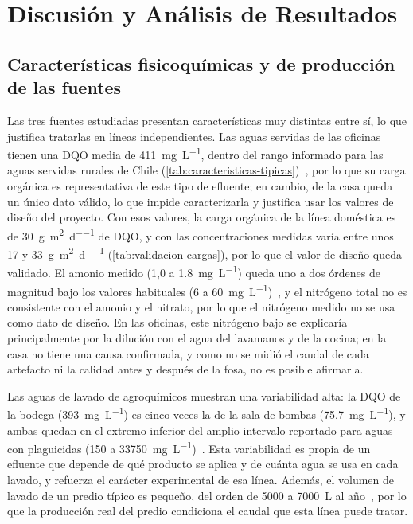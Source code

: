\chapter{Discusión y Análisis de Resultados}
\label{cap:discusion}

\section{Características fisicoquímicas y de producción de las fuentes}
\label{sec:dis-caracterizacion}

Las tres fuentes estudiadas presentan características muy distintas entre sí, lo que justifica tratarlas en líneas independientes.
Las aguas servidas de las oficinas tienen una DQO media de \qty{411}{\milli\gram\per\liter}, dentro del rango informado para las aguas servidas rurales de Chile (\cref{tab:caracteristicas-tipicas})~\parencite{araya2014aguas}, por lo que su carga orgánica es representativa de este tipo de efluente; en cambio, de la casa queda un único dato válido, lo que impide caracterizarla y justifica usar los valores de diseño del proyecto.
Con esos valores, la carga orgánica de la línea doméstica es de \qty{30}{\gram\per\square\meter\per\day} de DQO, y con las concentraciones medidas varía entre unos 17 y \qty{33}{\gram\per\square\meter\per\day} (\cref{tab:validacion-cargas}), por lo que el valor de diseño queda validado.
El amonio medido (1,0 a \qty{1.8}{\milli\gram\per\liter}) queda uno a dos órdenes de magnitud bajo los valores habituales (6 a \qty{60}{\milli\gram\per\liter})~\parencite{araya2014aguas}, y el nitrógeno total no es consistente con el amonio y el nitrato, por lo que el nitrógeno medido no se usa como dato de diseño.
En las oficinas, este nitrógeno bajo se explicaría principalmente por la dilución con el agua del lavamanos y de la cocina; en la casa no tiene una causa confirmada, y como no se midió el caudal de cada artefacto ni la calidad antes y después de la fosa, no es posible afirmarla.

Las aguas de lavado de agroquímicos muestran una variabilidad alta: la DQO de la bodega (\qty{393}{\milli\gram\per\liter}) es cinco veces la de la sala de bombas (\qty{75.7}{\milli\gram\per\liter}), y ambas quedan en el extremo inferior del amplio intervalo reportado para aguas con plaguicidas (150 a \qty{33750}{\milli\gram\per\liter})~\parencite{saleh2020removal}.
Esta variabilidad es propia de un efluente que depende de qué producto se aplica y de cuánta agua se usa en cada lavado, y refuerza el carácter experimental de esa línea.
Además, el volumen de lavado de un predio típico es pequeño, del orden de 5000 a \qty{7000}{\liter} al año~\parencite{braul2018robust}, por lo que la producción real del predio condiciona el caudal que esta línea puede tratar.

